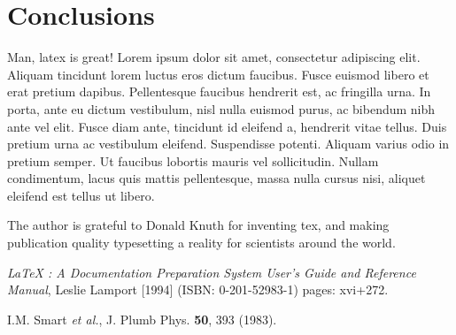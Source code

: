 \documentclass[aps,floatfix,prd,showpacs]{revtex4}
\begin{document}
\section{Conclusions}

Man, latex is great! Lorem ipsum dolor sit amet, consectetur adipiscing elit. Aliquam tincidunt lorem luctus eros dictum faucibus. Fusce euismod libero et erat pretium dapibus. Pellentesque faucibus hendrerit est, ac fringilla urna. In porta, ante eu dictum vestibulum, nisl nulla euismod purus, ac bibendum nibh ante vel elit. Fusce diam ante, tincidunt id eleifend a, hendrerit vitae tellus. Duis pretium urna ac vestibulum eleifend. Suspendisse potenti. Aliquam varius odio in pretium semper. Ut faucibus lobortis mauris vel sollicitudin. Nullam condimentum, lacus quis mattis pellentesque, massa nulla cursus nisi, aliquet eleifend est tellus ut libero.

\acknowledgments
The author is grateful to Donald Knuth for inventing tex, and making publication quality typesetting a reality for scientists around the world.

\begin{thebibliography}{99}

 {\sl LaTeX : A Documentation Preparation System User's Guide and Reference Manual}, Leslie Lamport [1994] (ISBN: 0-201-52983-1) pages: xvi+272.

I.M. Smart {\it et al.}, J. Plumb Phys. {\bf 50}, 393 (1983).

\end{thebibliography}
\end{document}
